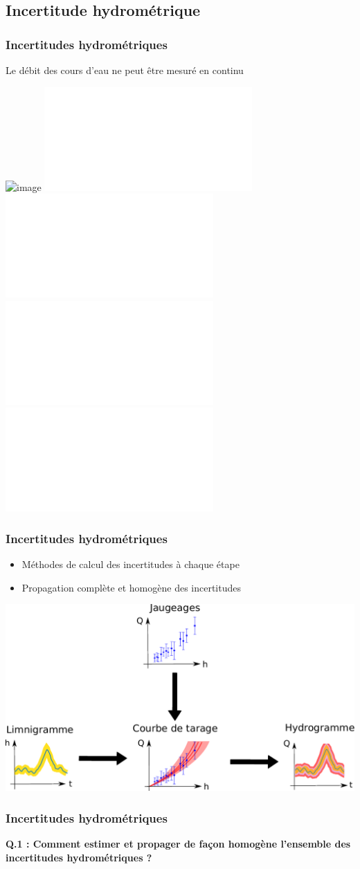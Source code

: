 \documentclass[compress,9pt]{beamer}
\begin{document}
	\subsection{Incertitude hydrométrique}
	\begin{frame}[t]
		\frametitle{Incertitudes hydrométriques}
      	Le débit des cours d'eau ne peut être mesuré en continu
		\vfill
		\begin{center}
			\includegraphics<2>[width = .6\textwidth]{./Figures/LimniVienne.png}
			\includegraphics<3>[width = .7\textwidth]{./Figures/Hydrom1.pdf}
			\includegraphics<4>[width = .7\textwidth]{./Figures/Hydrom2.pdf}
			\includegraphics<5>[width = .7\textwidth]{./Figures/Hydrom3.pdf}
			\includegraphics<6>[width = .7\textwidth]{./Figures/Hydrom4.pdf}
		\end{center}

	\end{frame}
	
	\begin{frame}%
		\frametitle{Incertitudes hydrométriques}
		\begin{center}\begin{itemize}
		\centering
			\item<1->[\Huge{$\textcolor{green}{\checkmark}$}] Méthodes de calcul des incertitudes à chaque étape\\
			\vspace{10pt}
			\item<2>[\Huge{$\textcolor{red}{X}$}] Propagation complète et homogène des incertitudes
		\end{itemize}\end{center}	
		\vspace{10pt}
		\begin{center}
			\includegraphics[width = .7\textwidth]{./Figures/Hydrom4.pdf}
		\end{center}
	\end{frame}
	
	\begin{frame}
		\frametitle{Incertitudes hydrométriques}
		\centering
		\vfill
		\Large{\textbf{Q.1 : Comment estimer et propager de façon homogène l'ensemble des incertitudes hydrométriques ?}}
		\vfill
	\end{frame}
	
\end{document}
